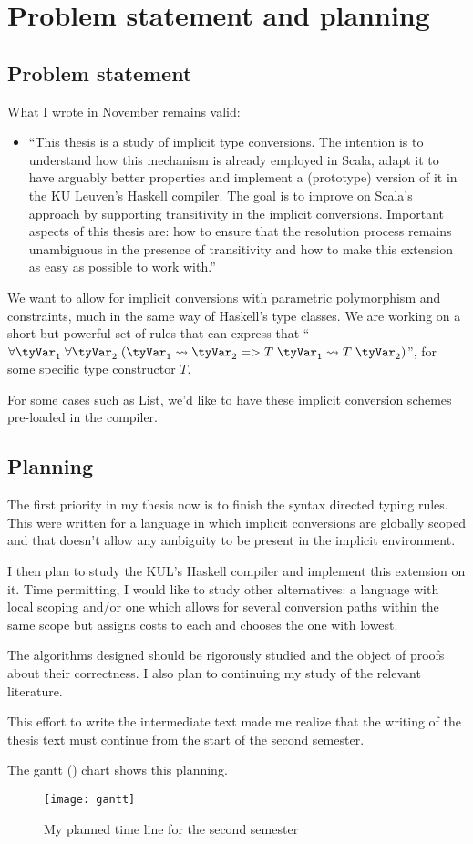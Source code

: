 \chapter{Problem statement and planning}
\label{planning}
\section{Problem statement}
What I wrote in November remains valid:
\begin{itemize}
\item ``This  thesis  is  a  study  of  implicit  type conversions.  The intention is to understand how this mechanism is already employed in Scala, adapt it to have arguably better properties and implement a (prototype) version of it in the KU Leuven's Haskell compiler.  The goal is to improve on Scala's approach by supporting transitivity in the implicit conversions.   Important  aspects  of  this  thesis  are:  how  to  ensure  that  the resolution process remains unambiguous in the presence of transitivity and how to make this extension as easy as possible to work with.''
\end{itemize}
We want to allow for implicit conversions with parametric polymorphism and constraints, much in the same way of Haskell's type classes. We are working on a short but powerful set of rules that can express that ``$\forall \tyVar_1 . \forall \tyVar_2 . (\tyVar_1 \rightsquigarrow \tyVar_2 => T \; \tyVar_1 \rightsquigarrow T \;\tyVar_2)$'', for some specific type constructor $T$.

For some cases such as List, we'd like to have these implicit conversion schemes pre-loaded in the compiler.
\section{Planning}
The first priority in my thesis now is to finish the syntax directed typing rules. This were written for a language in which implicit conversions are globally scoped and that doesn't allow any ambiguity to be present in the implicit environment.

I then plan to study the KUL's Haskell compiler and implement this extension on it. Time permitting, I would like to study other alternatives: a language with local scoping and/or one which allows for several conversion paths within the same scope but assigns costs to each and chooses the one with lowest.

The algorithms designed should be rigorously studied and the object of proofs about their correctness. I also plan to continuing my study of the relevant literature.

This effort to write the intermediate text made me realize that the writing of the thesis text must continue from the start of the second semester.

The gantt () chart shows this planning.
\begin{figure}
  \centering
  \texttt{[image: gantt]}
  \label{gantt}
  \caption{My planned time line for the second semester}
\end{figure}



